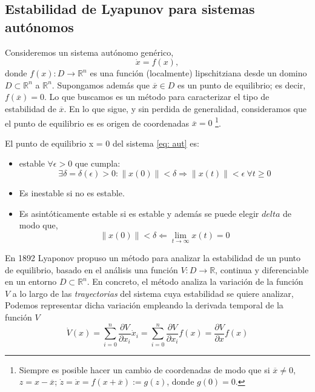 \subsection{Estabilidad de Lyapunov para sistemas autónomos}
Consideremos un sistema autónomo genérico,
\begin{equation}\label{eq: aut}
\dot x = f(x),
\end{equation}
donde $f(x): D\rightarrow \mathbb{R}^n$ es una función (localmente) lipschitziana desde un domino $D \subset \mathbb{R}^n$ a $\mathbb{R}^n$. Supongamos además que $\overline x \in D$ es un punto de equilibrio; es decir, $f(\overline x) = 0$. Lo que buscamos es un método para caracterizar el tipo de estabilidad de $\overline x$. En lo que sigue, y sin perdida de generalidad, consideramos que el punto de equilibrio es es origen de coordenadas $\overline x = 0$ \footnote{Siempre es posible hacer un cambio de coordenadas de modo que si $\overline x \neq 0$, $z = x-\overline x$; $\dot z = \dot x = f(x+\overline x) := g(z)$, donde $g(0)=0$.}.

\begin{definition}
El punto de equilibrio x = 0 del sistema \ref{eq: aut} es:
\begin{itemize}
\item estable $\forall \epsilon > 0$ que cumpla:
\begin{equation*}
 \exists \delta =\delta(\epsilon)>0: \| x(0) \| < \delta \Rightarrow \| x(t)\| < \epsilon \ \forall t \ge 0
\end{equation*}
 
 \item Es inestable si no es estable.
 \item Es asintóticamente estable si es estable y además se puede elegir $delta$ de modo que,
\begin{equation*}
\| x(0)\| < \delta \Leftarrow \lim_{t \to \infty} x(t) = 0
\end{equation*}
\end{itemize}
\end{definition}

En 1892 Lyaponov propuso un método para analizar la estabilidad de un punto de equilibrio, basado en el análisis  una función $V:D\to \mathbb{R}$, continua y diferenciable en un entorno $D \subset \mathbb{R}^n$. En concreto, el método analiza la variación de la función $V$ a lo largo de las \emph{trayectorias} del sistema cuya estabilidad se quiere analizar, Podemos representar dicha variación empleando la derivada temporal de la función $V$
\begin{equation}
\dot V(x) = \sum_{i=0}^{n}\frac{\partial V}{\partial x_i} \dot x_i = \sum_{i=0}^{n}\frac{\partial V}{\partial x_i} f(x) = \frac{\partial V}{\partial x}f(x)
\end{equation}


